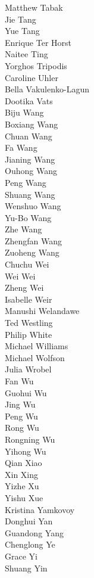 Matthew Tabak\\
Jie Tang\\
Yue Tang\\
Enrique Ter Horst\\
Naitee Ting\\
Yorghos Tripodis\\
Caroline Uhler\\
Bella Vakulenko-Lagun\\
Dootika Vats\\
Biju Wang\\
Boxiang Wang\\
Chuan Wang\\
Fa Wang\\
Jianing Wang\\
Ouhong Wang\\
Peng Wang\\
Shuang Wang\\
Wenshuo Wang\\
Yu-Bo Wang\\
Zhe Wang\\
Zhengfan Wang\\
Zuoheng Wang\\
Chuchu Wei\\
Wei Wei\\
Zheng Wei\\
Isabelle Weir\\
Manushi Welandawe\\
Ted Westling\\
Philip White\\
Michael Williams\\
Michael Wolfson\\
Julia Wrobel\\
Fan Wu\\
Guohui Wu\\
Jing Wu\\
Peng Wu\\
Rong Wu\\
Rongning Wu\\
Yihong Wu\\
Qian Xiao\\
Xin Xing\\
Yizhe Xu\\
Yishu Xue\\
Kristina Yamkovoy\\
Donghui Yan\\
Guandong Yang\\
Chenglong Ye\\
Grace Yi\\
Shuang Yin\\
